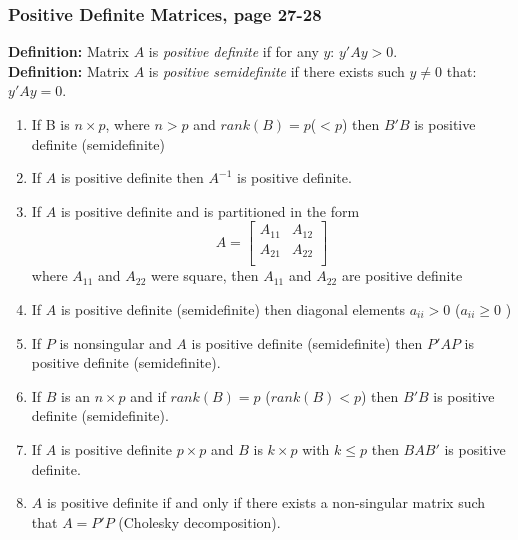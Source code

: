 \documentclass[]{article}
\begin{document}
\subsubsection{Positive Definite Matrices, page 27-28}
\textbf{Definition:} Matrix $A$ is \emph{positive definite} if for any $y$: $y'Ay > 0$.\\
\textbf{Definition:} Matrix $A$ is \emph{positive semidefinite} if there exists such $y \neq 0$ that: $y'Ay = 0$.
\begin{enumerate}[1)]
\item If B is $n\times p$, where $n>p$ and $rank(B)=p$($<p$) then $B'B$ is positive definite (semidefinite)
\item If $A$ is positive definite then $A^{-1}$ is positive definite.
\item If $A$ is positive definite and is partitioned in the form
\[ A =
\begin{bmatrix}
    A_{11}       & A_{12}  \\
    A_{21}       & A_{22} \\
\end{bmatrix}
\]
where $A_{11}$ and $A_{22}$ were square, then $A_{11}$ and $A_{22}$ are positive definite
\item If $A$ is positive definite (semidefinite) then diagonal elements $a_{ii}>0$ ($a_{ii}\geq 0$ )
\item If $P$ is nonsingular and $A$ is positive definite (semidefinite) then $P'AP$ is positive definite (semidefinite).
\item If $B$ is an $n\times p$ and if $rank(B)=p$ ($rank(B)<p$) then $B'B$ is positive definite (semidefinite).
\item If $A$ is positive definite $p \times p$ and $B$ is $k\times p$ with $k \leq p$ then $BAB'$ is positive definite.
\item $A$ is positive definite if and only if there exists a non-singular matrix such that $A=P'P$ (Cholesky decomposition).
\end{enumerate}

\end{document}
